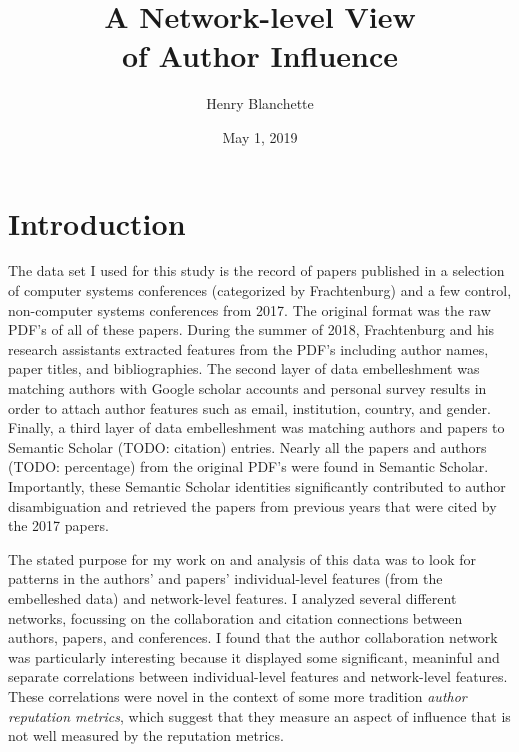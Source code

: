 \documentclass{article}
\title{\sc A Network-level View \\ of Author Influence}
\author{Henry Blanchette}
\date{May 1, 2019}
\renewcommand{\it}{\textit}
\begin{document}

\maketitle


\section{Introduction}

The data set I used for this study is the record of papers published in a selection of computer systems conferences (categorized by Frachtenburg) and a few control, non-computer systems conferences from 2017.
The original format was the raw PDF's of all of these papers.
During the summer of 2018, Frachtenburg and his research assistants extracted features from the PDF's including author names, paper titles, and bibliographies.
The second layer of data embelleshment was matching authors with Google scholar accounts and personal survey results in order to attach author features such as email, institution, country, and gender.
Finally, a third layer of data embelleshment was matching authors and papers to Semantic Scholar (TODO: citation) entries.
Nearly all the papers and authors (TODO: percentage) from the original PDF's were found in Semantic Scholar.
Importantly, these Semantic Scholar identities significantly contributed to author disambiguation and retrieved the papers from previous years that were cited by the 2017 papers.

The stated purpose for my work on and analysis of this data was to look for patterns in the authors' and papers' individual-level features (from the embelleshed data) and network-level features.
I analyzed several different networks, focussing on the collaboration and citation connections between authors, papers, and conferences.
I found that the author collaboration network was particularly interesting because it displayed some significant, meaninful and separate correlations between individual-level features and network-level features.
These correlations were novel in the context of some more tradition \it{author reputation metrics}, which suggest that they measure an aspect of influence that is not well measured by the reputation metrics.
\end{document}
